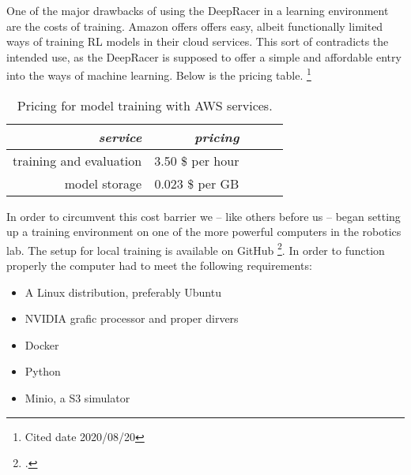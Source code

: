  One of the major drawbacks of using the DeepRacer in a learning environment are the costs of training. Amazon offers offers easy, albeit functionally limited ways of training RL models in their cloud services. This sort of contradicts the intended use, as the DeepRacer is supposed to offer a simple and affordable entry into the ways of machine learning. Below is the pricing table. \footnote{Cited date 2020/08/20}
 \begin{table}
 \caption{Pricing for model training with AWS services.}
 \label{tab:services}
 \centering
 \setlength{\tabcolsep}{5mm}
 \def\arraystretch{1.25}
 \begin{tabular}{|r|r|c|c|c|}
 \hline
 \emph{service} & \emph{pricing} \\
 \hline\hline
 training and evaluation & 3.50 \$ per hour \\
 \hline
 model storage & 0.023 \$ per GB \\
 \hline
 \end{tabular}
 \end{table}
 In order to circumvent this cost barrier we -- like others before us -- began setting up a training environment on one of the more powerful computers in the robotics lab.
 The setup for local training is available on GitHub \footcite{https://github.com/aws-deepracer-community/deepracer}. In order to function properly the computer had to meet the following requirements:
 \begin{itemize}
 \item A Linux distribution, preferably Ubuntu
 \item NVIDIA grafic processor and proper dirvers
 \item Docker
 \item Python
 \item Minio, a S3 simulator
 \end{itemize}